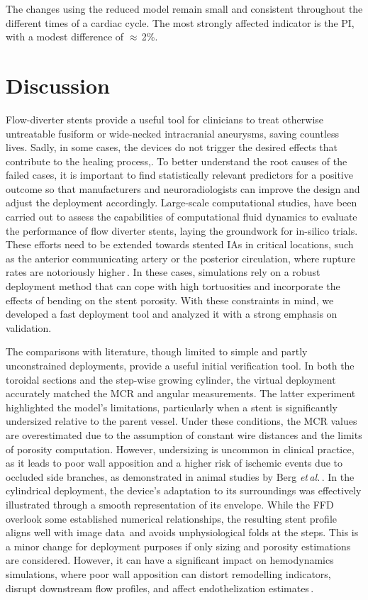 The changes using the reduced model remain small and consistent throughout the different times of a cardiac cycle. The most strongly affected indicator is the PI, with a modest difference of $\approx$\,2\%.

\section{Discussion}
Flow-diverter stents provide a useful tool for clinicians to treat otherwise untreatable fusiform or wide-necked intracranial aneurysms, saving countless lives. Sadly, in some cases, the devices do not trigger the desired effects that contribute to the healing process,\cite{Maragkos2020, Dandapat2021}. To better understand the root causes of the failed cases, it is important to find statistically relevant predictors for a positive outcome so that manufacturers and neuroradiologists can improve the design and adjust the deployment accordingly. Large-scale computational studies,\cite{Sarrami-Foroushani2021} have been carried out to assess the capabilities of computational fluid dynamics to evaluate the performance of flow diverter stents, laying the groundwork for in-silico trials. These efforts need to be extended towards stented IAs in critical locations, such as the anterior communicating artery or the posterior circulation, where rupture rates are notoriously higher\,\cite{Brown2014}. In these cases, simulations rely on a robust deployment method that can cope with high tortuosities and incorporate the effects of bending on the stent porosity. With these constraints in mind, we developed a fast deployment tool and analyzed it with a strong emphasis on validation.

The comparisons with literature, though limited to simple and partly unconstrained deployments, provide a useful initial verification tool. In both the toroidal sections and the step-wise growing cylinder, the virtual deployment accurately matched the MCR and angular measurements. The latter experiment highlighted the model's limitations, particularly when a stent is significantly undersized relative to the parent vessel. Under these conditions, the MCR values are overestimated due to the assumption of constant wire distances and the limits of porosity computation. However, undersizing is uncommon in clinical practice, as it leads to poor wall apposition and a higher risk of ischemic events due to occluded side branches, as demonstrated in animal studies by Berg \textit{et\,al.}\,\cite{Berg2016}. In the cylindrical deployment, the device's adaptation to its surroundings was effectively illustrated through a smooth representation of its envelope. While the FFD overlook some established numerical relationships, the resulting stent profile aligns well with image data\,\cite{Shapiro2014a} and avoids unphysiological folds at the steps. This is a minor change for deployment purposes if only sizing and porosity estimations are considered. However, it can have a significant impact on hemodynamics simulations, where poor wall apposition can distort remodelling indicators, disrupt downstream flow profiles, and affect endothelization estimates\,\cite{Janiga2013, Ravindran2019}.

